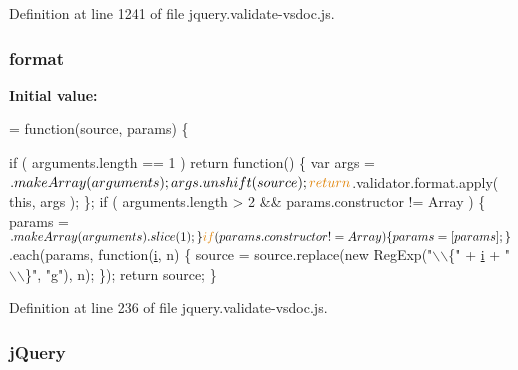 Definition at line 1241 of file jquery.\+validate-\/vsdoc.\+js.

\hypertarget{jquery_8validate-vsdoc_8js_a387137c43ed9616d39ba90e890d181eb}{}
\subsubsection[{format}]{\setlength{\rightskip}{0pt plus 5cm}format}\label{jquery_8validate-vsdoc_8js_a387137c43ed9616d39ba90e890d181eb}
{\bfseries Initial value\+:}
\begin{DoxyCode}
= \textcolor{keyword}{function}(source, params) \{
    

    \textcolor{keywordflow}{if} ( arguments.length == 1 ) 
        \textcolor{keywordflow}{return} \textcolor{keyword}{function}() \{
            var args = $.makeArray(arguments);
            args.unshift(source);
            \textcolor{keywordflow}{return} $.validator.format.apply( \textcolor{keyword}{this}, args );
        \};
    \textcolor{keywordflow}{if} ( arguments.length > 2 && params.constructor != Array  ) \{
        params = $.makeArray(arguments).slice(1);
    \}
    \textcolor{keywordflow}{if} ( params.constructor != Array ) \{
        params = [ params ];
    \}
    $.each(params, \textcolor{keyword}{function}(\hyperlink{obj_2_release_2_package_2_package_tmp_2_scripts_2respond_8min_8js_a5e25b1d1bed9ab5f3174b76d6a722180}{i}, n) \{
        source = source.replace(\textcolor{keyword}{new} RegExp(\textcolor{stringliteral}{"\(\backslash\)\(\backslash\)\{"} + \hyperlink{obj_2_release_2_package_2_package_tmp_2_scripts_2respond_8min_8js_a5e25b1d1bed9ab5f3174b76d6a722180}{i} + \textcolor{stringliteral}{"\(\backslash\)\(\backslash\)\}"}, \textcolor{stringliteral}{"g"}), n);
    \});
    \textcolor{keywordflow}{return} source;
\}
\end{DoxyCode}


Definition at line 236 of file jquery.\+validate-\/vsdoc.\+js.

\hypertarget{jquery_8validate-vsdoc_8js_a2b1d6f9c448e3ce72f4e1865d6e38d2c}{}
\subsubsection[{j\+Query}]{\setlength{\rightskip}{0pt plus 5cm}j\+Query}\label{jquery_8validate-vsdoc_8js_a2b1d6f9c448e3ce72f4e1865d6e38d2c}


